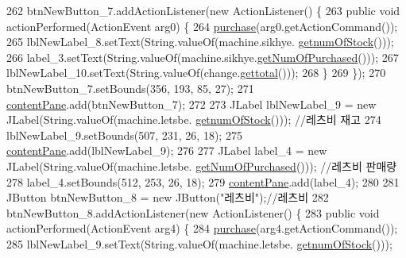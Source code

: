 \begin{DoxyCode}
262         btnNewButton\_7.addActionListener(\textcolor{keyword}{new} ActionListener() \{
263             \textcolor{keyword}{public} \textcolor{keywordtype}{void} actionPerformed(ActionEvent arg0) \{
264                 \hyperlink{class_vending_machine_1_1_machine_u_i_aadccf593dc69281c9ebbfe1fbe09b804}{purchase}(arg0.getActionCommand());
265                 lblNewLabel\_8.setText(String.valueOf(machine.sikhye.
      \hyperlink{class_vending_machine_1_1_product_a199bec8565bf69e9231248a49076a01b}{getnumOfStock}()));
266                 label\_3.setText(String.valueOf(machine.sikhye.\hyperlink{class_vending_machine_1_1_product_aefa8a5881c5569171a8cf1161b4bd911}{getNumOfPurchased}()));
267                 lblNewLabel\_10.setText(String.valueOf(change.\hyperlink{class_vending_machine_1_1_change_a07a32d7240178343fa1273d075d73c64}{gettotal}()));
268             \}
269         \});
270         btnNewButton\_7.setBounds(356, 193, 85, 27);
271         \hyperlink{class_vending_machine_1_1_machine_u_i_ac8ef25585e46da798d067af0eefa1a03}{contentPane}.add(btnNewButton\_7);
272         
273         JLabel lblNewLabel\_9 = \textcolor{keyword}{new} JLabel(String.valueOf(machine.letsbe.
      \hyperlink{class_vending_machine_1_1_product_a199bec8565bf69e9231248a49076a01b}{getnumOfStock}())); \textcolor{comment}{//레츠비 재고}
274         lblNewLabel\_9.setBounds(507, 231, 26, 18);
275         \hyperlink{class_vending_machine_1_1_machine_u_i_ac8ef25585e46da798d067af0eefa1a03}{contentPane}.add(lblNewLabel\_9);      
276         
277         JLabel label\_4 = \textcolor{keyword}{new} JLabel(String.valueOf(machine.letsbe.
      \hyperlink{class_vending_machine_1_1_product_aefa8a5881c5569171a8cf1161b4bd911}{getNumOfPurchased}())); \textcolor{comment}{//레츠비 판매량}
278         label\_4.setBounds(512, 253, 26, 18);
279         \hyperlink{class_vending_machine_1_1_machine_u_i_ac8ef25585e46da798d067af0eefa1a03}{contentPane}.add(label\_4);                
280 
281         JButton btnNewButton\_8 = \textcolor{keyword}{new} JButton(\textcolor{stringliteral}{"레츠비"});\textcolor{comment}{//레츠비}
282         btnNewButton\_8.addActionListener(\textcolor{keyword}{new} ActionListener() \{
283             \textcolor{keyword}{public} \textcolor{keywordtype}{void} actionPerformed(ActionEvent arg4) \{
284                 \hyperlink{class_vending_machine_1_1_machine_u_i_aadccf593dc69281c9ebbfe1fbe09b804}{purchase}(arg4.getActionCommand());
285                 lblNewLabel\_9.setText(String.valueOf(machine.letsbe.
      \hyperlink{class_vending_machine_1_1_product_a199bec8565bf69e9231248a49076a01b}{getnumOfStock}()));

\end{DoxyCode}
